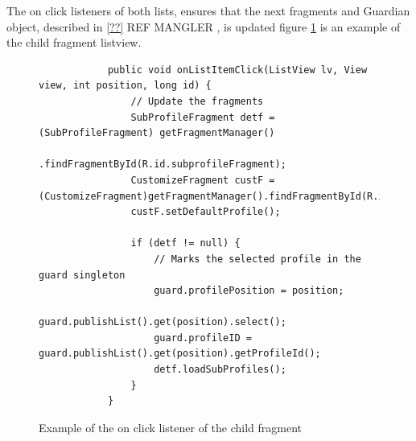 The on click listeners of both lists, ensures that the next fragments and Guardian object, described in \ref{??}\color[rgb]{1,0.41,0.13} REF MANGLER \color[rgb]{0,0,0}, is updated figure \ref{code:listview_onclick_example} is an example of the child fragment listview.

\begin{figure}[H]%
		\begin{lstlisting}
			public void onListItemClick(ListView lv, View view, int position, long id) {
				// Update the fragments
				SubProfileFragment detf = (SubProfileFragment) getFragmentManager()
						.findFragmentById(R.id.subprofileFragment);
				CustomizeFragment custF = (CustomizeFragment)getFragmentManager().findFragmentById(R.id.customizeFragment);
				custF.setDefaultProfile();
				
				if (detf != null) {
					// Marks the selected profile in the guard singleton
					guard.profilePosition = position; 
					guard.publishList().get(position).select();
					guard.profileID = guard.publishList().get(position).getProfileId();
					detf.loadSubProfiles();
				}
			}
		\end{lstlisting}
	\caption{Example of the on click listener of the child fragment}%
	\label{code:listview_onclick_example}%
\end{figure}

